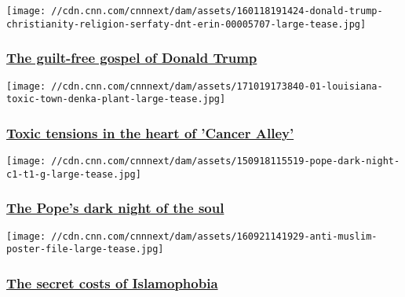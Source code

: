 \href{/2016/10/21/politics/trump-religion-gospel/index.html}{}

\texttt{[image: //cdn.cnn.com/cnnnext/dam/assets/160118191424-donald-trump-christianity-religion-serfaty-dnt-erin-00005707-large-tease.jpg]}

\hypertarget{the-guilt-free-gospel-of-donald-trump}{%
\subsubsection{\texorpdfstring{\href{/2016/10/21/politics/trump-religion-gospel/index.html}{The
guilt-free gospel of Donald
Trump}}{The guilt-free gospel of Donald Trump}}\label{the-guilt-free-gospel-of-donald-trump}}

\href{/2017/10/20/health/louisiana-toxic-town/index.html}{}

\texttt{[image: //cdn.cnn.com/cnnnext/dam/assets/171019173840-01-louisiana-toxic-town-denka-plant-large-tease.jpg]}

\hypertarget{toxic-tensions-in-the-heart-of-cancer-alley}{%
\subsubsection{\texorpdfstring{\href{/2017/10/20/health/louisiana-toxic-town/index.html}{Toxic
tensions in the heart of 'Cancer
Alley'}}{Toxic tensions in the heart of 'Cancer Alley'}}\label{toxic-tensions-in-the-heart-of-cancer-alley}}

\href{http://www.cnn.com/interactive/2015/09/specials/pope-dark-night-of-the-soul/}{}

\texttt{[image: //cdn.cnn.com/cnnnext/dam/assets/150918115519-pope-dark-night-c1-t1-g-large-tease.jpg]}

\hypertarget{the-popes-dark-night-of-the-soul}{%
\subsubsection{\texorpdfstring{\href{http://www.cnn.com/interactive/2015/09/specials/pope-dark-night-of-the-soul/}{The
Pope's dark night of the
soul}}{The Pope's dark night of the soul}}\label{the-popes-dark-night-of-the-soul}}

\href{/2016/09/23/us/islamerica-secret-costs-islamophobia/index.html}{}

\texttt{[image: //cdn.cnn.com/cnnnext/dam/assets/160921141929-anti-muslim-poster-file-large-tease.jpg]}

\hypertarget{the-secret-costs-of-islamophobia}{%
\subsubsection{\texorpdfstring{\href{/2016/09/23/us/islamerica-secret-costs-islamophobia/index.html}{The
secret costs of
Islamophobia}}{The secret costs of Islamophobia}}\label{the-secret-costs-of-islamophobia}}

